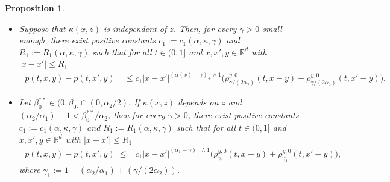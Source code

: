 \documentclass[a4paper,11pt]{amsart}
\renewcommand{\le}{\leqslant}
\newcommand{\R}{\mathds R}
\newcommand{\B}{\beta}
\newcommand{\K}{\kappa}
\newcommand{\A}{\alpha}
\newcommand{\G}{\gamma}
\newtheorem{proposition}[theorem]{Proposition}
\theoremstyle{definition}
\begin{document}
\begin{proposition}\label{t4-2}
\begin{itemize}
\item[(1)] Suppose that $\K(x,z)$ is independent of $z$. Then, for every $\G>0$ small enough, there exist positive constants
$c_1:=c_1(\A,\K,\G)$ and $R_1:=R_1(\A,\K,\G)$ such that for all $t \in (0,1]$ and $x,x',y \in \R^d$ with $|x-x'|\le R_1$
\begin{equation}\label{t4-2-1}
\begin{split}
\big|p(t,x,y)-p(t,x',y)\big|
&\le c_1
|x-x'|^{(\A(x)-\G)_+\wedge 1}
\big(\rho^{y,0}_{{\G/(2\A_2)}}(t,x-y)+\rho^{y,0}_{{\G/(2\A_2)}}(t,x'-y)\big).
\end{split}
\end{equation}

\item[(2)]  Let $\B_0^{**}\in(0,\B_0]\cap(0,{\alpha_2}/{2}).$ If $\K(x,z)$ depends on $z$ and
${(\A_2/\A_1)}-1<\B_0^{**}/{\A_2}$, then for every $\G>0$, there exist positive constants
$c_1:=c_1(\A,\K,\G)$ and $R_1:=R_1(\A,\K,\G)$ such that for all $t \in (0,1]$ and $x,x',y \in \R^d$ with $|x-x'|\le R_1$
\begin{equation}\label{t4-2-1aa}
\begin{split}
\big|p(t,x,y)-p(t,x',y)\big|\le& c_1|x-x'|^{(\A_1-\G)_+\wedge 1}\big(\rho^{y,0}_{\G_1 }(t,x-y)+
\rho^{y,0}_{\G_1 }(t,x'-y)\big),
\end{split}
\end{equation}
where $\G_1:=1-({\A_2}/{\A_1})+({\G}/({2\A_2}))$.
\end{itemize}
\end{proposition}
\end{document}
